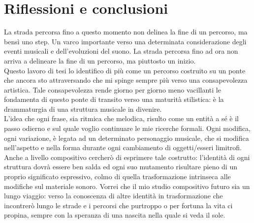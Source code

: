 
\chapter{Riflessioni e conclusioni}
\label{chp:Riflessioni e conclusioni}

La strada percorsa fino a questo momento non delinea la fine di un percorso, ma bensì uno step. Un varco importante verso una determinata considerazione degli eventi musicali e dell'evoluzioni del suono.
La strada percorsa fino ad ora non arriva a delineare la fine di un percorso, ma piuttosto un inizio. \\
Questo lavoro di tesi lo identifico di più come un percorso costruito su un ponte che ancora sto attraversando che mi spinge sempre più verso una consapevolezza artistica. Tale consapevolezza rende giorno per giorno meno vacillanti le fondamenta di questo ponte di transito verso una maturità stilistica: è la drammaturgia di una struttura musicale in divenire. \\
L'idea che ogni frase, sia ritmica che melodica, risulto come un entità a sé è il passo odierno e sul quale voglio continuare le mie ricerche formali. Ogni modifica, ogni variazione, è legata ad un determinato personaggio musicale, che si modifica nell'aspetto e nella forma durante ogni cambiamento di oggetti/esseri limitrofi. \\
Anche a livello compositivo cercherò di esprimere tale costrutto: l'identità di ogni struttura dovrà essere ben salda ed ogni suo mutamento risultare pieno di un proprio significato espressivo, colmo di quella trasformazione intrinseca alle modifiche sul materiale sonoro. Vorrei che il mio studio compositivo futuro sia un lungo viaggio: verso la conoscenza di altre identità in trasformazione che incontrerò lungo le strade e i percorsi che purtroppo o per fortuna la vita ci propina, sempre con la speranza di una nascita nella quale si veda il sole.

